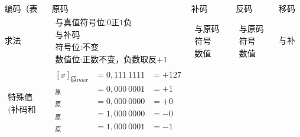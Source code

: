 $$
    \begin{array}{|l|l|l|l|l|}
        \hline
        \text{编码（表示法）}                                                 &
        \text{原码}                                                      &
        \text{补码}                                                      &
        \text{反码}                                                      &
        \text{移码}
        \\
        \hline
        \text{求法}                                                      &
        \begin{array}{l}
            \text{与真值符号位:0正1负} \\
            \text{与补码}         \\
            \text{符号位:不变}      \\
            \text{数值位:正数不变，负数取反+1}
        \end{array}                                         &
        \begin{array}{l}
            \text{与原码}    \\
            \text{符号位：不变} \\
            \text{数值位：正数不变，负数取反+1}
        \end{array}                                         &
        \begin{array}{l}
            \text{与原码}    \\
            \text{符号位：不变} \\
            \text{数值位：正数不变，负数取反}
        \end{array}                                           &
        \text{与补码符号位相反}
        \\
        \hline
        \begin{array}{l}
            特殊值 \\
            \text{(补码和移码为通常情况)}
        \end{array}                                            &
        \begin{array}{lll}
            [x]_{\text{原}max} & = 0,111 \ 1111 & = +127 \\
            [+1]_\text{原}     & = 0,000 \ 0001 & =+1    \\
            [+0]_\text{原}     & = 0,000 \ 0000 & =+0    \\
            [-0]_\text{原}     & = 1,000 \ 0000 & =-0    \\
            [-1]_\text{原}     & = 1,000 \ 0001 & =-1    \\

\end{array}
\end{array}$$
